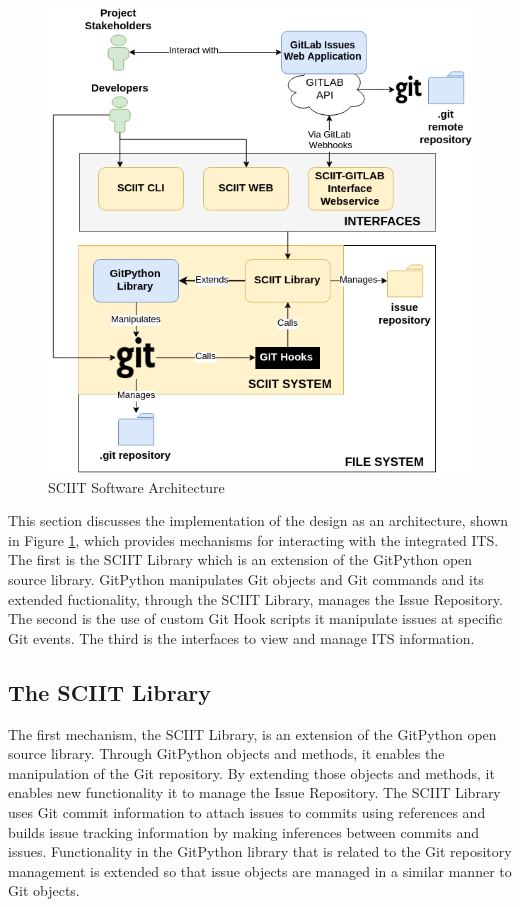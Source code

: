 \documentclass{mproj}
\begin{document}
\begin{figure}[h!]
\caption{SCIIT Software Architecture}
\label{fig:sciit-software-arch}
\centering
\includegraphics[width=12cm]{sciit-software-arch}
\end{figure}

This section discusses the implementation of the design as an architecture, shown in Figure \ref{fig:sciit-software-arch}, which provides mechanisms for interacting with the integrated ITS. The first is the SCIIT Library which is an extension of the GitPython open source library. GitPython manipulates Git objects and Git commands and its extended fuctionality, through the SCIIT Library, manages the Issue Repository. The second is the use of custom Git Hook scripts it manipulate issues at specific Git events.  The third is the interfaces to view and manage ITS information.

\subsection{The SCIIT Library}

The first mechanism, the SCIIT Library, is an extension of the GitPython open source library. Through GitPython objects and methods, it enables the manipulation of the Git repository. By extending those objects and methods, it enables new functionality it to manage the Issue Repository. The SCIIT Library uses Git commit information to attach issues to commits using references and builds issue tracking information by making inferences between commits and issues. Functionality in the GitPython library that is related to the Git repository management is extended so that issue objects are managed in a similar manner to Git objects.
\end{document}
